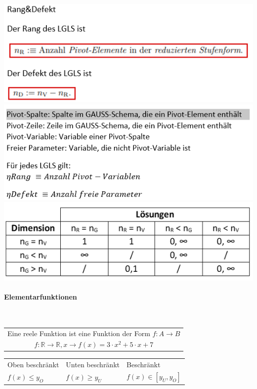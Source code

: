 \includegraphics[width=\columnwidth]{./images/lgs5.png}
\includegraphics[width=\columnwidth]{./images/lgs6.png}
\includegraphics[width=\columnwidth]{./images/lgs7.png}
\vspace{1mm}

\paragraph{Elementarfunktionen}\mbox{}\\
\noindent
\begin{tabularx}{\columnwidth}{@{}X@{}}
    \hline
    Eine reele Funktion ist eine Funktion der Form $f: A \to B$ \\
    \[ f: \mathbb{R} \to \mathbb{R},x \rightarrow f(x) = 3 \cdot x^2 + 5 \cdot x + 7 \] \\
\end{tabularx}
\begin{tabularx}{\columnwidth}{@{}X|X|X@{}}
    Oben beschränkt & Unten beschränkt & Beschränkt \\
    $f(x) \leq y_O$ & $f(x) \geq y_U$ & $f(x) \in [y_U,y_O]$ \\ \hline
\end{tabularx}
\vspace{1mm}

